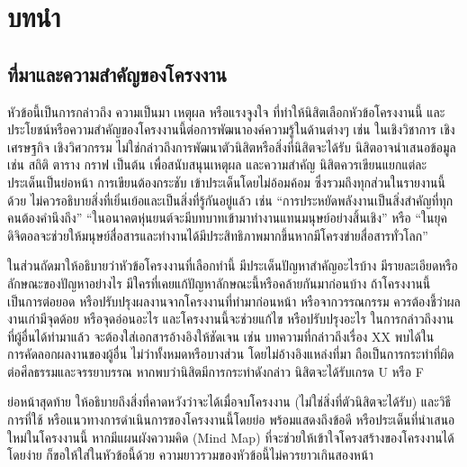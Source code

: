 \documentclass[11pt,a4paper]{article}
\begin{document}
\newpage
\thispagestyle{empty}
\tableofcontents

\newpage
\setcounter{page}{1}
\section{บทนำ}
\subsection{ที่มาและความสำคัญของโครงงาน}
หัวข้อนี้เป็นการกล่าวถึง ความเป็นมา เหตุผล หรือแรงจูงใจ ที่ทำให้นิสิตเลือกหัวข้อโครงงานนี้ และประโยชน์หรือความสำคัญของโครงงานนี้ต่อการพัฒนาองค์ความรู้ในด้านต่างๆ เช่น ในเชิงวิชาการ เชิงเศรษฐกิจ เชิงวิศวกรรม ไม่ใช่กล่าวถึงการพัฒนาตัวนิสิตหรือสิ่งที่นิสิตจะได้รับ นิสิตอาจนำเสนอข้อมูล เช่น สถิติ ตาราง กราฟ เป็นต้น เพื่อสนับสนุนเหตุผล และความสำคัญ นิสิตควรเขียนแยกแต่ละประเด็นเป็นย่อหน้า การเขียนต้องกระชับ เข้าประเด็นโดยไม่อ้อมค้อม ซึ่งรวมถึงทุกส่วนในรายงานนี้ด้วย ไม่ควรอธิบายสิ่งที่เยิ่นเย้อและเป็นสิ่งที่รู้กันอยู่แล้ว เช่น “การประหยัดพลังงานเป็นสิ่งสำคัญที่ทุกคนต้องคำนึงถึง” “ในอนาคตหุ่นยนต์จะมีบทบาทเข้ามาทำงานแทนมนุษย์อย่างสิ้นเชิง” หรือ “ในยุคดิจิตอลจะช่วยให้มนุษย์สื่อสารและทำงานได้มีประสิทธิภาพมากขึ้นหากมีโครงข่ายสื่อสารทั่วโลก”


ในส่วนถัดมาให้อธิบายว่าหัวข้อโครงงานที่เลือกทำนี้ มีประเด็นปัญหาสำคัญอะไรบ้าง มีรายละเอียดหรือลักษณะของปัญหาอย่างไร มีใครที่เคยแก้ปัญหาลักษณะนี้หรือคล้ายกันมาก่อนบ้าง ถ้าโครงงานนี้เป็นการต่อยอด หรือปรับปรุงผลงานจากโครงงานที่ทำมาก่อนหน้า หรือจากวรรณกรรม ควรต้องชี้ว่าผลงานเก่ามีจุดด้อย หรือจุดอ่อนอะไร และโครงงานนี้จะช่วยแก้ไข หรือปรับปรุงอะไร ในการกล่าวถึงงานที่ผู้อื่นได้ทำมาแล้ว จะต้องใส่เอกสารอ้างอิงให้ชัดเจน เช่น บทความที่กล่าวถึงเรื่อง XX พบได้ใน ~\cite{WaJ:08} การคัดลอกผลงานของผู้อื่น ไม่ว่าทั้งหมดหรือบางส่วน โดยไม่อ้างอิงแหล่งที่มา ถือเป็นการกระทำที่ผิดต่อศีลธรรมและจรรยาบรรณ หากพบว่านิสิตมีการกระทำดังกล่าว นิสิตจะได้รับเกรด U หรือ F


ย่อหน้าสุดท้าย ให้อธิบายถึงสิ่งที่คาดหวังว่าจะได้เมื่อจบโครงงาน (ไม่ใช่สิ่งที่ตัวนิสิตจะได้รับ) และวิธีการที่ใช้ หรือแนวทางการดำเนินการของโครงงานนี้โดยย่อ พร้อมแสดงถึงข้อดี หรือประเด็นที่นำเสนอใหม่ในโครงงานนี้ หากมีแผนผังความคิด (Mind Map) ที่จะช่วยให้เข้าใจโครงสร้างของโครงงานได้โดยง่าย ก็ขอให้ใส่ในหัวข้อนี้ด้วย ความยาวรวมของหัวข้อนี้ไม่ควรยาวเกินสองหน้า
\end{document}
